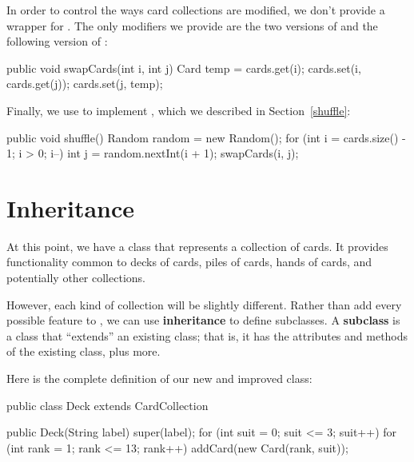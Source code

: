 
In order to control the ways card collections are modified, we don't provide a wrapper for .
The only modifiers we provide are the two versions of  and the following version of :

\begin{code}
public void swapCards(int i, int j) {
    Card temp = cards.get(i);
    cards.set(i, cards.get(j));
    cards.set(j, temp);
}
\end{code}

Finally, we use  to implement , which we described in Section~\ref{shuffle}:

\begin{code}
public void shuffle() {
    Random random = new Random();
    for (int i = cards.size() - 1; i > 0; i--) {
        int j = random.nextInt(i + 1);
        swapCards(i, j);
    }
}
\end{code}



\section{Inheritance}

At this point, we have a class that represents a collection of cards.
It provides functionality common to decks of cards, piles of cards, hands of cards, and potentially other collections.


However, each kind of collection will be slightly different.
Rather than add every possible feature to , we can use {\bf inheritance} to define subclasses.
A {\bf subclass} is a class that ``extends'' an existing class; that is, it has the attributes and methods of the existing class, plus more.

Here is the complete definition of our new and improved  class:

\begin{code}
public class Deck extends CardCollection {

    public Deck(String label) {
        super(label);
        for (int suit = 0; suit <= 3; suit++) {
            for (int rank = 1; rank <= 13; rank++) {
                addCard(new Card(rank, suit));
            }
        }
    }
}
\end{code}

